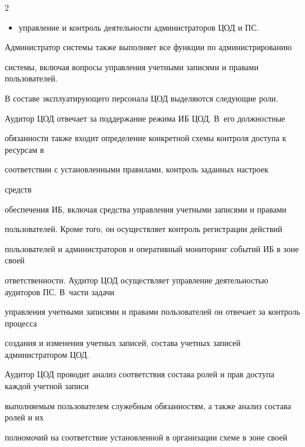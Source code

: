 \begin{multicols}{2}
\begin{itemize}
с уста\-нов\-лен\-ны\-ми в организации правилами доступа к ресурсам;


\item управление и контроль деятельности администраторов ЦОД и ПС.


\end{itemize}





       Администратор системы также выполняет все функции по администрированию 


сис\-те\-мы, включая вопросы управления учетными записями и правами пользователей.


       


       В составе эксплуатирующего персонала ЦОД выделяются следующие роли.


       


       Аудитор ЦОД отвечает за поддержание режима ИБ ЦОД. В~его должностные 


обязанности \mbox{также} входит определение конкретной схемы конт\-ро\-ля доступа к ресурсам в 


соответствии с уста\-нов\-лен\-ны\-ми правилами, контроль заданных настроек\linebreak


 средств 


обеспечения ИБ, включая средства управ\-ле\-ния учетными записями и правами 


пользо\-вателей. Кроме того, он осуществляет контроль регистра\-ции действий 


пользователей и администраторов и оперативный мониторинг событий ИБ в зоне своей 


ответственности. Аудитор ЦОД осуществляет управление деятельностью аудиторов ПС. В~части задачи 


управ\-ле\-ния учетными записями и правами пользователей он отвечает за контроль процесса 


создания и изменения учетных записей, состава учетных записей администратором ЦОД. 


Аудитор ЦОД проводит анализ соответствия состава ролей и прав доступа каждой учетной записи 


выполняемым пользователем служебным обязанностям, а также анализ состава ролей и их 


полномочий на соответствие уста\-нов\-лен\-ной в организации схеме в зоне своей 



\end{multicols}
